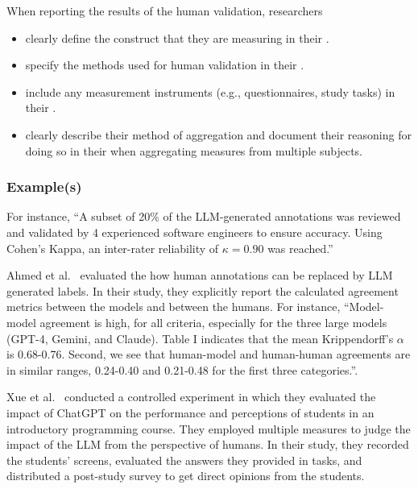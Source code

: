 When reporting the results of the human validation, researchers
\begin{itemize}
    \item \must clearly define the construct that they are measuring in their \paper.
    \item \must specify the methods used for human validation in their \paper.
    \item \should include any measurement instruments (e.g., questionnaires, study tasks) in their \supplementarymaterial.
    \item \should clearly describe their method of aggregation and document their reasoning for doing so in their \paper when aggregating measures from multiple subjects.
\end{itemize}

\subsubsection{Example(s)}

For instance, ``A subset of 20\% of the LLM-generated annotations was reviewed and validated by 4 experienced software engineers to ensure accuracy. Using Cohen's Kappa, an inter-rater reliability of $\kappa = 0.90$ was reached.''

Ahmed et al.~\cite{DBLP:journals/corr/abs-2408-05534} evaluated the how human annotations can be replaced by LLM generated labels.
In their study, they explicitly report the calculated agreement metrics between the models and between the humans.
For instance, ``Model-model agreement is high, for all criteria, especially for the three large models (GPT-4, Gemini, and Claude). Table I indicates that the mean Krippendorff’s $\alpha$ is 0.68-0.76. 
Second, we see that human-model and human-human agreements are in similar ranges, 0.24-0.40 and 0.21-0.48
for the first three categories.''.

Xue et al.~\cite{DBLP:conf/icse/XueCBTH24} conducted a controlled experiment in which they evaluated the impact of ChatGPT on the performance and perceptions of students in an introductory programming course.
They employed multiple measures to judge the impact of the LLM from the perspective of humans.
In their study, they recorded the students' screens, evaluated the answers they provided in tasks, and distributed a post-study survey to get direct opinions from the students.

